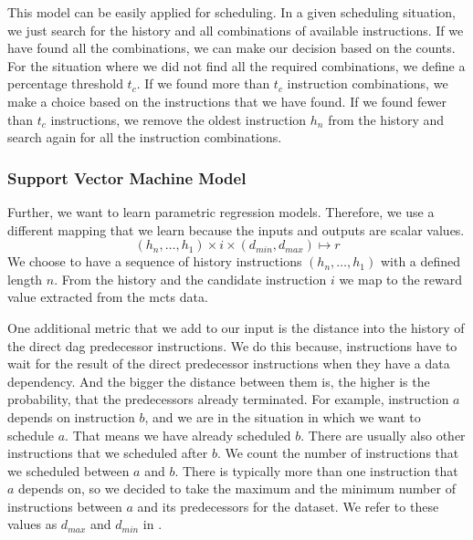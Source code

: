 This model can be easily applied for scheduling.
In a given scheduling situation, we just search for the history and all combinations of available instructions.
If we have found all the combinations, we can make our decision based on the counts.
For the situation where we did not find all the required combinations, we define a percentage threshold $t_c$.
If we found more than $t_c$ instruction combinations, we make a choice based on the instructions that we have found.
If we found fewer than $t_c$ instructions, we remove the oldest instruction $h_n$ from the history and search again for all the instruction combinations. 

\subsubsection{Support Vector Machine Model}
Further, we want to learn parametric regression models.
Therefore, we use a different mapping that we learn because the inputs and outputs are scalar values.
\begin{equation}
    (h_n, \ldots, h_1) \times i \times (d_{min}, d_{max}) \mapsto r
    \label{eqn:approach:regression-mapping}
\end{equation}
We choose to have a sequence of history instructions $(h_n, \ldots, h_1)$ with a defined length $n$.
From the history and the candidate instruction $i$ we map to the reward value extracted from the \ac{mcts} data.

One additional metric that we add to our input is the distance into the history of the direct \ac{dag} predecessor instructions.
We do this because, instructions have to wait for the result of the direct predecessor instructions when they have a data dependency.
And the bigger the distance between them is, the higher is the probability, that the predecessors already terminated. 
For example, instruction $a$ depends on instruction $b$, and we are in the situation in which we want to schedule $a$.
That means we have already scheduled $b$.
There are usually also other instructions that we scheduled after $b$.
We count the number of instructions that we scheduled between $a$ and $b$.
There is typically more than one instruction that $a$ depends on, so we decided to take the maximum and the minimum number of instructions between $a$ and its predecessors for the dataset.
We refer to these values as $d_{max}$ and $d_{min}$ in .


